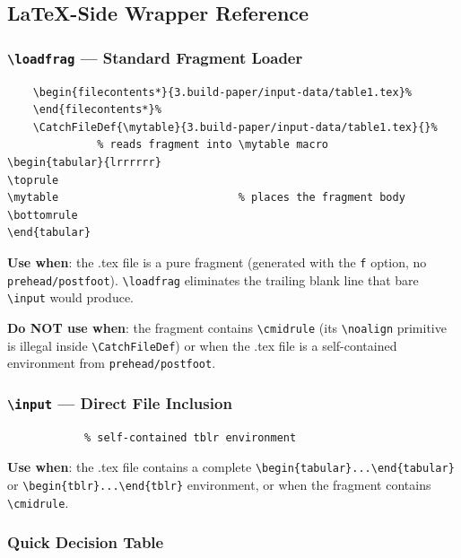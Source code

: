 \documentclass[11pt]{article}
\numberwithin{table}{section}
\newcommand{\loadfrag}[1]{%
	\begin{filecontents*}{#1}%
	\end{filecontents*}%
	\CatchFileDef{\mytable}{#1}{}%
}
\begin{document}
\subsection{LaTeX-Side Wrapper Reference}

\subsubsection{\texttt{\textbackslash loadfrag} --- Standard Fragment Loader}

\begin{lstlisting}[style=latex]
\loadfrag{3.build-paper/input-data/table1.tex}              % reads fragment into \mytable macro
\begin{tabular}{lrrrrrr}
\toprule
\mytable                            % places the fragment body
\bottomrule
\end{tabular}
\end{lstlisting}

\textbf{Use when}: the .tex file is a pure fragment (generated with the \texttt{f} option, no \texttt{prehead/postfoot}). \texttt{\textbackslash loadfrag} eliminates the trailing blank line that bare \texttt{\textbackslash input} would produce.

\textbf{Do NOT use when}: the fragment contains \texttt{\textbackslash cmidrule} (its \texttt{\textbackslash noalign} primitive is illegal inside \texttt{\textbackslash CatchFileDef}) or when the .tex file is a self-contained environment from \texttt{prehead/postfoot}.

\subsubsection{\texttt{\textbackslash input} --- Direct File Inclusion}

\begin{lstlisting}[style=latex]
                  % self-contained file from prehead/postfoot
            % self-contained tblr environment
\end{lstlisting}

\textbf{Use when}: the .tex file contains a complete \texttt{\textbackslash begin\{tabular\}...\textbackslash end\{tabular\}} or \texttt{\textbackslash begin\{tblr\}...\textbackslash end\{tblr\}} environment, or when the fragment contains \texttt{\textbackslash cmidrule}.

\subsubsection{Quick Decision Table}
\end{document}
